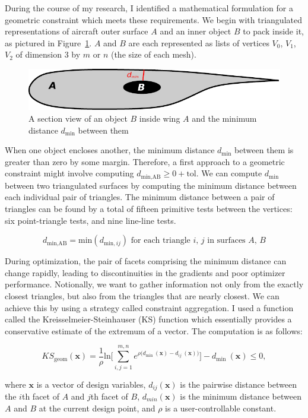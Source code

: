 \documentclass[11pt,letterpaper]{article}
\begin{document}
\qquad During the course of my research, I identified a mathematical formulation for a geometric constraint which meets these requirements.
We begin with triangulated representations of aircraft outer surface $A$ and an inner object $B$ to pack inside it, as pictured in Figure~\ref{fig:schematic}.
$A$ and $B$ are each represented as lists of vertices $V_0$, $V_1$, $V_2$ of dimension 3 by $m$ or $n$ (the size of each mesh).

\begin{figure}[ht]
  \centering
  \includegraphics[width=0.45\linewidth]{figures/schematic}
  \caption{A section view of an object $B$ inside wing $A$ and the minimum distance $d_\text{min}$ between them}
  \label{fig:schematic}
\end{figure}

When one object encloses another, the minimum distance $d_\text{min}$ between them is greater than zero by some margin.
Therefore, a first approach to a geometric constraint might involve computing $d_\text{min,AB} \geq 0 + \text{tol}$.
We can compute $d_\text{min}$ between two triangulated surfaces by computing the minimum distance between each individual pair of triangles.
The minimum distance between a pair of triangles can be found by a total of fifteen primitive tests between the vertices: six point-triangle tests, and nine line-line tests. %

\begin{equation}
  \label{eq:dmin}
  d_\text{min,AB} = \text{min}(d_{\text{min},ij}) \text{ for each triangle } i, \, j \text{ in surfaces } A, \, B
\end{equation}

During optimization, the pair of facets comprising the minimum distance can change rapidly, leading to discontinuities in the gradients and poor optimizer performance.
Notionally, we want to gather information not only from the exactly closest triangles, but also from the triangles that are nearly closest.
We can achieve this by using a strategy called constraint aggregation.
I used a function called the Kreisselmeier-Steinhauser (KS) function which essentially provides a conservative estimate of the extremum of a vector.
The computation is as follows:

\begin{equation}
  \label{ks_geom}
  KS_\text{geom}(\textbf{x}) = \frac{1}{\rho} \textrm{ln} \Bigg[\sum_{i,j=1}^{m,n} e^{\rho\big(d_\text{min}\:(\textbf{x})-d_{ij}\:(\textbf{x})\big)}\Bigg] - d_\text{min}\:(\textbf{x}) \leq 0 ,
\end{equation}

where $\textbf{x}$ is a vector of design variables,
$d_{ij}(\textbf{x})$ is the pairwise distance between the $i$th facet of $A$ and $j$th facet of $B$,
$d_{min}(\textbf{x})$ is the minimum distance between $A$ and $B$ at the current design point, and
$\rho$ is a user-controllable constant.
\end{document}
